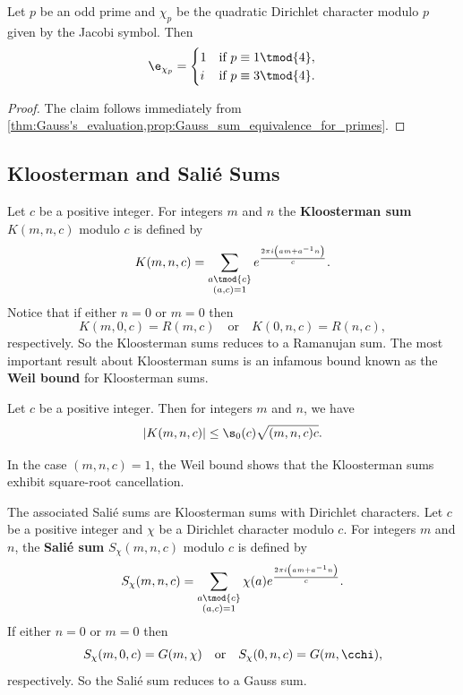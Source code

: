 \documentclass[12pt]{article}
\begin{document}
      \begin{corollary}
        Let \(p\) be an odd prime and \(\chi_{p}\) be the quadratic Dirichlet character modulo \(p\) given by the Jacobi symbol. Then
        \[
          \e_{\chi_{p}} = \begin{cases} 1 & \text{if \(p \equiv 1 \tmod{4}\)}, \\ i & \text{if \(p \equiv 3 \tmod{4}\)}. \end{cases}
        \]
      \end{corollary}
      \begin{proof}
        The claim follows immediately from \cref{thm:Gauss's_evaluation,prop:Gauss_sum_equivalence_for_primes}.
      \end{proof}
    \subsection{Kloosterman and Sali\'e Sums}
      Let \(c\) be a positive integer. For integers \(m\) and \(n\) the \textbf{Kloosterman sum} \(K(m,n,c)\) modulo \(c\) is defined by
      \[
        K(m,n,c) = \sum_{\substack{a \tmod{c} \\ (a,c) = 1}}e^{\frac{2\pi i\left(am+a^{-1}n\right)}{c}}.
      \]
      Notice that if either \(n = 0\) or \(m = 0\) then
      \[
        K(m,0,c) = R(m,c) \quad \text{or} \quad K(0,n,c) = R(n,c),
      \]
      respectively. So the Kloosterman sums reduces to a Ramanujan sum. The most important result about Kloosterman sums is an infamous bound known as the \textbf{Weil bound} for Kloosterman sums.

      \begin{theorem*}
        Let \(c\) be a positive integer. Then for integers \(m\) and \(n\), we have
        \[
          |K(m,n,c)| \le \s_{0}(c)\sqrt{(m,n,c)c}.
        \]
      \end{theorem*}

      In the case \((m,n,c) = 1\), the Weil bound shows that the Kloosterman sums exhibit square-root cancellation.

      The associated Sali\'e sums are Kloosterman sums with Dirichlet characters. Let \(c\) be a positive integer and \(\chi\) be a Dirichlet character modulo \(c\). For integers \(m\) and \(n\), the \textbf{Sali\'e sum} \(S_{\chi}(m,n,c)\) modulo \(c\) is defined by
      \[
        S_{\chi}(m,n,c) = \sum_{\substack{a \tmod{c} \\ (a,c) = 1}}\chi(a)e^{\frac{2\pi i\left(am+a^{-1}n\right)}{c}}.
      \]
      If either \(n = 0\) or \(m = 0\) then
      \[
        S_{\chi}(m,0,c) = G(m,\chi) \quad \text{or} \quad S_{\chi}(0,n,c) = G(m,\cchi),
      \]
      respectively. So the Sali\'e sum reduces to a Gauss sum.
\end{document}
